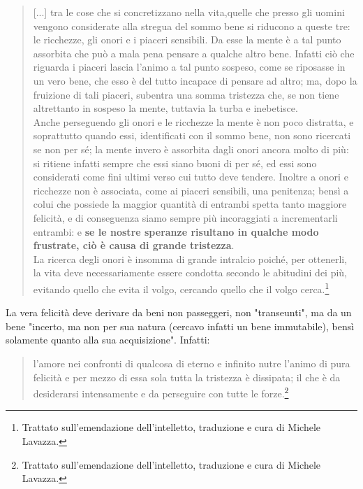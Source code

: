 \begin{quotation}
	\small [...] tra le cose che si concretizzano nella vita,quelle che presso gli uomini vengono
	considerate alla stregua del sommo bene si riducono a queste tre: le ricchezze, gli onori e i piaceri
	sensibili. Da esse la mente è a tal punto assorbita che può a mala pena pensare a qualche altro bene. Infatti ciò che riguarda i piaceri lascia l'animo a tal punto sospeso, come se riposasse in un vero
	bene, che esso è del tutto incapace di pensare ad altro; ma, dopo la fruizione di tali piaceri, subentra
	una somma tristezza che, se non tiene altrettanto in sospeso la mente, tuttavia la turba e inebetisce.\\
	Anche perseguendo gli onori e le ricchezze la mente è non poco distratta, e soprattutto
	quando essi, identificati con il sommo bene, non sono ricercati se non per sé; la mente invero è
	assorbita dagli onori ancora molto di più: si ritiene infatti sempre che essi siano buoni di per sé, ed
	essi sono considerati come fini ultimi verso cui tutto deve tendere. Inoltre a onori e ricchezze non è
	associata, come ai piaceri sensibili, una penitenza; bensì a colui che possiede la maggior quantità di
	entrambi spetta tanto maggiore felicità, e di conseguenza siamo sempre più incoraggiati a
	incrementarli entrambi: e \textbf{se le nostre speranze risultano in qualche modo frustrate, ciò è causa di
	grande tristezza}.\\
	La ricerca degli onori è insomma di grande intralcio poiché, per ottenerli, la vita deve necessariamente essere condotta secondo le abitudini dei più, evitando quello che evita il volgo,
	cercando quello che il volgo cerca.\footnote{Trattato sull'emendazione dell'intelletto, traduzione e cura di Michele Lavazza.}
\end{quotation}

La vera felicità deve derivare da beni non passeggeri, non "transeunti", ma da un bene "incerto, ma non per sua natura (cercavo infatti
un bene immutabile), bensì solamente quanto alla sua acquisizione". Infatti: 

\begin{quotation}
	\small l'amore nei confronti di qualcosa di eterno e infinito nutre l'animo di pura felicità e per mezzo di
	essa sola tutta la tristezza è dissipata; il che è da desiderarsi intensamente e da perseguire con tutte
	le forze.\footnote{Trattato sull'emendazione dell'intelletto, traduzione e cura di Michele Lavazza.}
\end{quotation}

